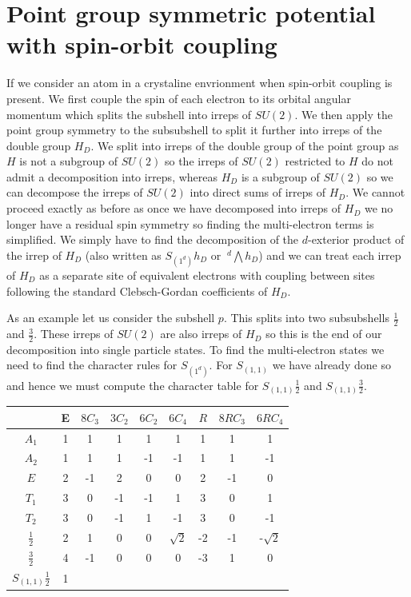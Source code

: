 \documentclass{article}
\begin{document}
\section{Point group symmetric potential with spin-orbit coupling}

If we consider an atom in a crystaline envrionment when spin-orbit coupling is present. We first couple the spin of each electron to its orbital angular momentum which splits the subshell into irreps of $SU(2)$. We then apply the point group symmetry to the subsubshell to split it further into irreps of the double group $H_D$. We split into irreps of the double group of the point group as $H$ is not a subgroup of $SU(2)$ so the irreps of $SU(2)$ restricted to $H$ do not admit a decomposition into irreps, whereas $H_D$ is a subgroup of $SU(2)$ so we can decompose the irreps of $SU(2)$ into direct sums of irreps of $H_D$. We cannot proceed exactly as before as once we have decomposed into irreps of $H_D$ we no longer have a residual spin symmetry so finding the multi-electron terms is simplified. We simply have to find the decomposition of the $d$-exterior product of the irrep of $H_D$ (also written as $S_{(1^d)}h_D$ or $\>^d\bigwedge h_D$) and we can treat each irrep of $H_D$ as a separate site of equivalent electrons with coupling between sites following the standard Clebsch-Gordan coefficients of $H_D$.

As an example let us consider the subshell $p$. This splits into two subsubshells $\frac{1}{2}$ and $\frac{3}{2}$. These irreps of $SU(2)$ are also irreps of $H_D$ so this is the end of our decomposition into single particle states. To find the multi-electron states we need to find the character rules for $S_{(1^d)}$. For $S_{(1,1)}$ we have already done so and hence we must compute the character table for $S_{(1,1)}\frac{1}{2}$ and $S_{(1,1)}\frac{3}{2}$.
\begin{tabular}{|c|c|c|c|c|c|c|c|c|}\hline
& E&$8C_3$&$3C_2$&$6C_2$&$6C_4$&$R$&$8RC_3$&$6RC_4$\\\hline
$A_1$& 1&1&1&1&1&1&1&1\\\hline
$A_2$& 1&1&1&-1&-1&1&1&-1\\\hline
$E$& 2&-1&2&0&0&2&-1&0\\\hline
$T_1$& 3&0&-1&-1&1&3&0&1\\\hline
$T_2$& 3&0&-1&1&-1&3&0&-1\\\hline
$\frac{1}{2}$& 2&1&0&0&$\sqrt{2}$&-2&-1&-$\sqrt{2}$\\\hline
$\frac{3}{2}$& 4&-1&0&0&0&-3&1&0\\\hline
$S_{(1,1)}\frac{1}{2}$& 1&&&&&&&\\\hline
\end{tabular}
\end{document}
